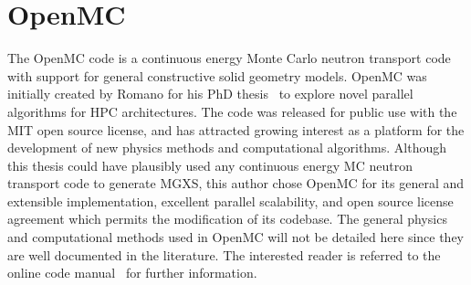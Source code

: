 
  


\section{OpenMC}
\label{sec:chap3-openmc}

The OpenMC code is a continuous energy Monte Carlo neutron transport code~\cite{romano2013openmc} with support for general constructive solid geometry models. OpenMC was initially created by Romano for his PhD thesis~\cite{romano2013parallel} to explore novel parallel algorithms for \ac{HPC} architectures. The code was released for public use with the MIT open source license, and has attracted growing interest as a platform for the development of new physics methods and computational algorithms. Although this thesis could have plausibly used any continuous energy \ac{MC} neutron transport code to generate \ac{MGXS}, this author chose OpenMC for its general and extensible implementation, excellent parallel scalability, and open source license agreement which permits the modification of its codebase. The general physics and computational methods used in OpenMC will not be detailed here since they are well documented in the literature. The interested reader is referred to the online code manual~\cite{openmc2016manual} for further information.

